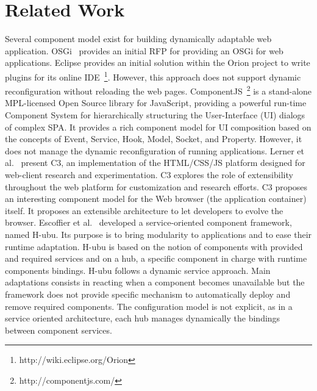 \section{Related Work}

Several component model exist for building dynamically adaptable web application. OSGi~\cite{hall2011osgi} provides an initial RFP for providing an OSGi for web applications. Eclipse provides an initial solution within the Orion project to write plugins for its online IDE~\footnote{http://wiki.eclipse.org/Orion}. However, this approach does not support dynamic reconfiguration without reloading the web pages.   ComponentJS~\footnote{http://componentjs.com/} is a stand-alone MPL-licensed Open Source library for JavaScript, providing a powerful run-time Component System for hierarchically structuring the User-Interface (UI) dialogs of complex SPA. It provides a rich component model for UI composition based on the concepts  of Event, Service, Hook, Model, Socket, and Property. However, it does not manage the dynamic reconfiguration of running applications. 
Lerner et al.~\cite{150010} present C3, an implementation of the HTML/CSS/JS platform designed for web-client research and experimentation. C3  explores the role of extensibility throughout the web platform for customization and research efforts. C3 proposes an interesting component model for the Web browser (the application container) itself. It proposes an extensible architecture to let developers to evolve the browser. 
Escoffier et al.~\cite{escoffier:hal-00854339} developed a service-oriented component framework, named H-ubu. Its purpose is to bring modularity to applications and to ease their runtime adaptation. H-ubu is based on the notion of components with provided and required services and on a hub, a specific component in charge with runtime components bindings. H-ubu  follows a dynamic service approach. Main adaptations consists in reacting when a component becomes unavailable but the framework does not provide specific mechanism to automatically deploy and remove required components. The configuration model is not explicit, as in a service oriented architecture, each hub manages dynamically the bindings between component services.